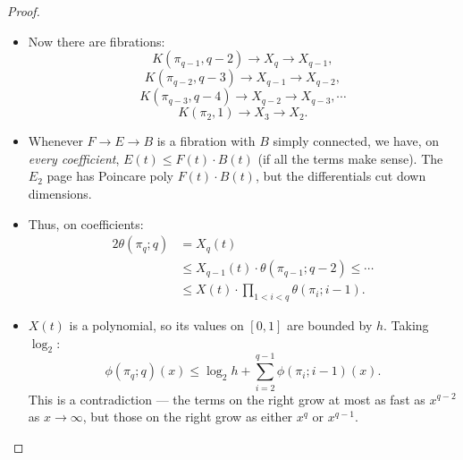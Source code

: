 \documentclass[11pt]{article}
\begin{document}
\begin{SerreCohModTwoEilMacLane}
\begin{proof}
\begin{itemize}
\item %
Now there are fibrations:
\[K(\pi_{q-1},q-2)\to X_{q}\to X_{q-1},\]
\[K(\pi_{q-2},q-3)\to X_{q-1}\to X_{q-2},\]
\[K(\pi_{q-3},q-4)\to X_{q-2}\to X_{q-3},\cdots\]
\[K(\pi_{2},1)\to X_{3}\to X_2.\]
\item Whenever $F\to E\to B$ is a fibration with $B$ simply connected, we have, on \emph{every coefficient}, $E(t)\leq F(t)\cdot B(t)$ (if all the terms make sense). The $E_2$ page has Poincare poly $F(t)\cdot B(t)$, but the differentials cut down dimensions.
\item Thus, on coefficients:
\begin{alignat*}{2}
\theta(\pi_q;q)&= X_q(t)\\
&\leq X_{q-1}(t)\cdot\theta(\pi_{q-1};q-2)\leq\cdots\\
&\leq X(t)\cdot \prod_{1<i<q}\theta(\pi_i;i-1).
\end{alignat*}
\item $X(t)$ is a polynomial, so its values on $[0,1]$ are bounded by $h$. Taking $\log_2$:
\[\phi(\pi_q;q)(x)\leq\log_2h+\sum_{i=2}^{q-1}\phi(\pi_i;i-1)(x).\]
This is a contradiction --- the terms on the right grow at most as fast as $x^{q-2}$ as $x\to\infty$, but those on the right grow as either $x^q$ or $x^{q-1}$.\qedhere
\end{itemize}
\end{proof}
\pagebreak

\end{SerreCohModTwoEilMacLane}
\end{document}
